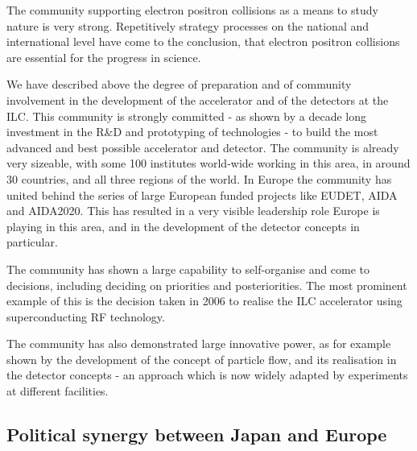 \documentclass[%
 reprint,
 amsmath,amssymb,
 aps,
]{revtex4-1}
\begin{document}
The community supporting electron positron collisions as a means to study nature 
is very strong. Repetitively strategy processes on the national and 
international level have come to the conclusion, that electron positron 
collisions are essential for the progress in science. 

We have described above the degree of preparation and of community involvement 
in the development of the accelerator and of the detectors at the ILC. This 
community is strongly committed - as shown by a decade long investment in the 
R\&D and prototyping of technologies - to build the most advanced and best 
possible accelerator and detector. The community is already very sizeable, with 
some 100 institutes world-wide working in this area, in around 30 countries, and 
all three regions of the world. In Europe the community has united behind the 
series of large European funded projects like EUDET, AIDA and AIDA2020. This has 
resulted in a very visible leadership role Europe is playing in this area, and 
in the development of the detector concepts in particular. 

The community has shown a large capability to self-organise and come to 
decisions, including deciding on priorities and posteriorities. The most 
prominent example of this is the decision taken in 2006 to realise the ILC 
accelerator using superconducting RF technology. 

The community has also demonstrated large innovative power, as for example shown 
by the development of the concept of particle flow, and its realisation in the 
detector concepts - an approach which is now widely adapted by experiments at 
different facilities. 

\subsection{\label{sec:discussionPol}Political synergy between Japan and Europe}
\end{document}
